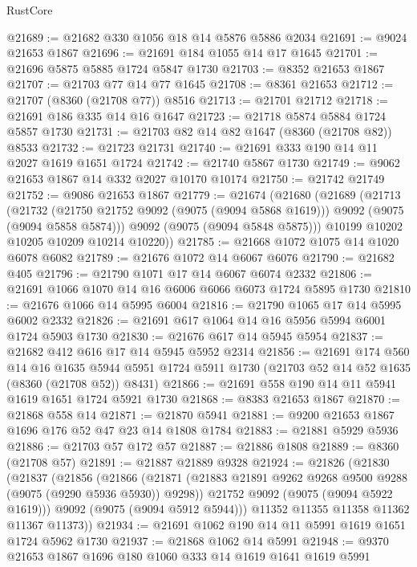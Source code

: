 \begin{lexlean}{RustCore}
\begin{coremodule}
@21689 := @21682 @330 @1056 @18 @14 @5876 @5886 @2034
@21691 := @9024 @21653 @1867
@21696 := @21691 @184 @1055 @14 @17 @1645
@21701 := @21696 @5875 @5885 @1724 @5847 @1730
@21703 := @8352 @21653 @1867
@21707 := @21703 @77 @14 @77 @1645
@21708 := @8361 @21653
@21712 := @21707 (@8360 (@21708 @77)) @8516
@21713 := @21701 @21712
@21718 := @21691 @186 @335 @14 @16 @1647
@21723 := @21718 @5874 @5884 @1724 @5857 @1730
@21731 := @21703 @82 @14 @82 @1647 (@8360 (@21708 @82)) @8533
@21732 := @21723 @21731
@21740 := @21691 @333 @190 @14 @11 @2027 @1619 @1651 @1724
@21742 := @21740 @5867 @1730
@21749 := @9062 @21653 @1867 @14 @332 @2027 @10170 @10174
@21750 := @21742 @21749
@21752 := @9086 @21653 @1867
@21779 := @21674
    (@21680
      (@21689
        (@21713
          (@21732
            (@21750 @21752 @9092 (@9075 (@9094 @5868 @1619)))
            @9092
            (@9075 (@9094 @5858 @5874)))
          @9092
          (@9075 (@9094 @5848 @5875)))
        @10199
        @10202
        @10205
        @10209
        @10214
        @10220))
@21785 := @21668 @1072 @1075 @14 @1020 @6078 @6082
@21789 := @21676 @1072 @14 @6067 @6076
@21790 := @21682 @405
@21796 := @21790 @1071 @17 @14 @6067 @6074 @2332
@21806 := @21691 @1066 @1070 @14 @16 @6006 @6066 @6073 @1724 @5895 @1730
@21810 := @21676 @1066 @14 @5995 @6004
@21816 := @21790 @1065 @17 @14 @5995 @6002 @2332
@21826 := @21691 @617 @1064 @14 @16 @5956 @5994 @6001 @1724 @5903 @1730
@21830 := @21676 @617 @14 @5945 @5954
@21837 := @21682 @412 @616 @17 @14 @5945 @5952 @2314
@21856 := @21691
    @174
    @560
    @14
    @16
    @1635
    @5944
    @5951
    @1724
    @5911
    @1730
    (@21703 @52 @14 @52 @1635 (@8360 (@21708 @52)) @8431)
@21866 := @21691 @558 @190 @14 @11 @5941 @1619 @1651 @1724 @5921 @1730
@21868 := @8383 @21653 @1867
@21870 := @21868 @558 @14
@21871 := @21870 @5941
@21881 := @9200 @21653 @1867 @1696 @176 @52 @47 @23 @14 @1808 @1784
@21883 := @21881 @5929 @5936
@21886 := @21703 @57 @172 @57
@21887 := @21886 @1808
@21889 := @8360 (@21708 @57)
@21891 := @21887 @21889 @9328
@21924 := @21826
    (@21830
      (@21837
        (@21856
          (@21866
            (@21871 (@21883 @21891 @9262 @9268 @9500 @9288 (@9075 (@9290 @5936 @5930)) @9298))
            @21752
            @9092
            (@9075 (@9094 @5922 @1619)))
          @9092
          (@9075 (@9094 @5912 @5944)))
        @11352
        @11355
        @11358
        @11362
        @11367
        @11373))
@21934 := @21691 @1062 @190 @14 @11 @5991 @1619 @1651 @1724 @5962 @1730
@21937 := @21868 @1062 @14 @5991
@21948 := @9370 @21653 @1867 @1696 @180 @1060 @333 @14 @1619 @1641 @1619 @5991

\end{coremodule}
\end{lexlean}

